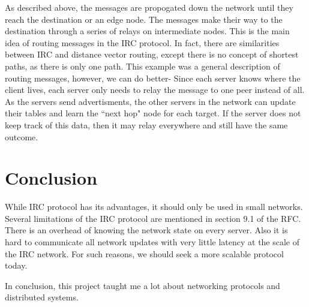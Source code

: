 \documentclass[letterpaper,twocolumn,10pt]{article}
\begin{document}
As described above, the messages are propogated down the network until they reach
the destination or an edge node. The messages make their way to the destination
through a series of relays on intermediate nodes. This is the main idea of routing
messages in the IRC protocol. In fact, there are similarities between IRC and
distance vector routing, except there is no concept of shortest paths, as there is only one path.
This example was a general description of routing
messages, however, we can do better- Since each server knows where the client lives,
each server only needs to relay the message to one peer instead of all. As the servers
send advertisments, the other servers in the network can update their tables and learn
the ``next hop" node for each target. If the server does not keep track of this data,
then it may relay everywhere and still have the same outcome.

\section{Conclusion}

While IRC protocol has its advantages, it should only be used in small networks.
Several limitations of the IRC protocol are mentioned in section 9.1 of the
RFC. There is an overhead of knowing the network state on every server. Also
it is hard to communicate all network updates with very little latency at the scale
of the IRC network. For such reasons, we should seek a more scalable protocol today.

In conclusion, this project taught me a lot about networking protocols and distributed systems.
\end{document}
